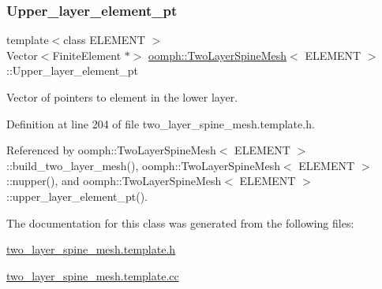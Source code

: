 \subsubsection{\texorpdfstring{Upper\+\_\+layer\+\_\+element\+\_\+pt}{Upper\_layer\_element\_pt}}
{\footnotesize\ttfamily template$<$class E\+L\+E\+M\+E\+NT $>$ \\
Vector$<$Finite\+Element $\ast$$>$ \hyperlink{classoomph_1_1TwoLayerSpineMesh}{oomph\+::\+Two\+Layer\+Spine\+Mesh}$<$ E\+L\+E\+M\+E\+NT $>$\+::Upper\+\_\+layer\+\_\+element\+\_\+pt\hspace{0.3cm}{\ttfamily [protected]}}



Vector of pointers to element in the lower layer. 



Definition at line 204 of file two\+\_\+layer\+\_\+spine\+\_\+mesh.\+template.\+h.



Referenced by oomph\+::\+Two\+Layer\+Spine\+Mesh$<$ E\+L\+E\+M\+E\+N\+T $>$\+::build\+\_\+two\+\_\+layer\+\_\+mesh(), oomph\+::\+Two\+Layer\+Spine\+Mesh$<$ E\+L\+E\+M\+E\+N\+T $>$\+::nupper(), and oomph\+::\+Two\+Layer\+Spine\+Mesh$<$ E\+L\+E\+M\+E\+N\+T $>$\+::upper\+\_\+layer\+\_\+element\+\_\+pt().



The documentation for this class was generated from the following files\+:\begin{DoxyCompactItemize}
\item 
\hyperlink{two__layer__spine__mesh_8template_8h}{two\+\_\+layer\+\_\+spine\+\_\+mesh.\+template.\+h}\item 
\hyperlink{two__layer__spine__mesh_8template_8cc}{two\+\_\+layer\+\_\+spine\+\_\+mesh.\+template.\+cc}\end{DoxyCompactItemize}
